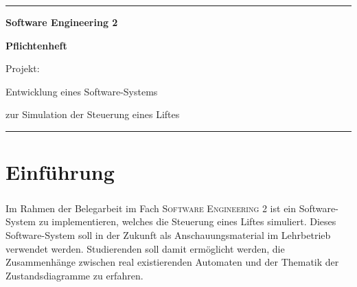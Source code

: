 


\begin{titlepage}
	\vspace*{\fill}

	\rule{\textwidth}{0.25pt}

	\vspace*{1cm}

	\begin{singlespace}
		\begin{center}	\Large	\bfseries
			Software Engineering 2
		\end{center}
	\end{singlespace}

	\vspace{1em}

	\begin{singlespace}
		\begin{center}	\Large \bfseries
		Pflichtenheft
		
		\vspace{2em}	\large
		Projekt:
		
		Entwicklung eines Software-Systems
		
		zur Simulation der Steuerung eines Liftes
		\end{center}
	\end{singlespace}

	\vspace*{5cm}

	\rule{\textwidth}{0.25pt}

	\vspace*{\fill}
\end{titlepage}


\tableofcontents


\chapter{Einführung}
\paragraph{}
Im Rahmen der Belegarbeit im Fach \textsc{Software Engineering 2} ist ein Software-System zu implementieren, welches die Steuerung eines Liftes simuliert. Dieses Software-System soll in der Zukunft als Anschauungsmaterial im Lehrbetrieb verwendet werden. Studierenden soll damit ermöglicht werden, die Zusammenhänge zwischen real existierenden Automaten und der Thematik der Zustandsdiagramme zu erfahren.

